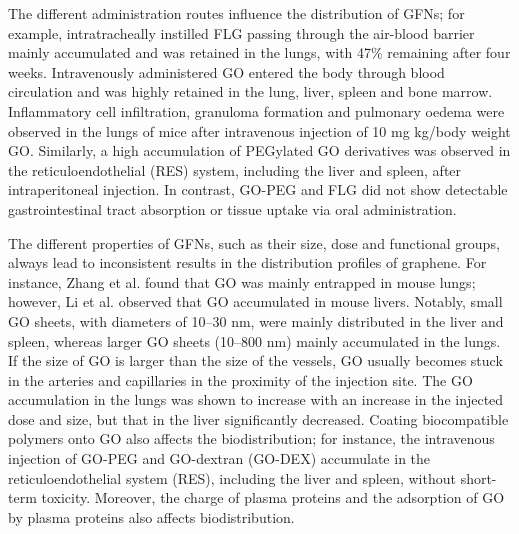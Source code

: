 \documentclass[twoside,twocolumn,9pt]{article}
\begin{document}
The different administration routes influence the distribution of GFNs; for example, intratracheally instilled FLG passing through the air-blood barrier mainly accumulated and was retained in the lungs, with 47\% remaining after four weeks. Intravenously administered GO entered the body through blood circulation and was highly retained in the lung, liver, spleen and bone marrow. Inflammatory cell infiltration, granuloma formation and pulmonary oedema were observed in the lungs of mice after intravenous injection of 10 mg kg/body weight GO. Similarly, a high accumulation of PEGylated GO derivatives was observed in the reticuloendothelial (RES) system, including the liver and spleen, after intraperitoneal injection. In contrast, GO-PEG and FLG did not show detectable gastrointestinal tract absorption or tissue uptake via oral administration.

The different properties of GFNs, such as their size, dose and functional groups, always lead to inconsistent results in the distribution profiles of graphene. For instance, Zhang et al. found that GO was mainly entrapped in mouse lungs; however, Li et al. observed that GO accumulated in mouse livers. Notably, small GO sheets, with diameters of 10–30 nm, were mainly distributed in the liver and spleen, whereas larger GO sheets (10–800 nm) mainly accumulated in the lungs. If the size of GO is larger than the size of the vessels, GO usually becomes stuck in the arteries and capillaries in the proximity of the injection site. The GO accumulation in the lungs was shown to increase with an increase in the injected dose and size, but that in the liver significantly decreased. Coating biocompatible polymers onto GO also affects the biodistribution; for instance, the intravenous injection of GO-PEG and GO-dextran (GO-DEX) accumulate in the reticuloendothelial system (RES), including the liver and spleen, without short-term toxicity. Moreover, the charge of plasma proteins and the adsorption of GO by plasma proteins also affects biodistribution.
\end{document}
